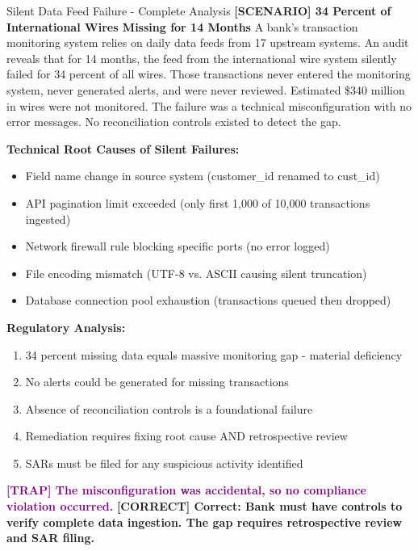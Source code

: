 \documentclass[11pt,a4paper]{beamer}
\newcommand{\trap}[1]{\textcolor{purple}{\textbf{[TRAP] #1}}}
\newcommand{\correct}[1]{\textcolor{green!50!black}{\textbf{[CORRECT] #1}}}
\newcommand{\scenario}[1]{\textcolor{blue!70!black}{\textbf{[SCENARIO] #1}}}
\begin{document}
	\begin{frame}{Silent Data Feed Failure - Complete Analysis}
		\scenario{34 Percent of International Wires Missing for 14 Months}
		A bank's transaction monitoring system relies on daily data feeds from 17 upstream systems. An audit reveals that for 14 months, the feed from the international wire system silently failed for 34 percent of all wires. Those transactions never entered the monitoring system, never generated alerts, and were never reviewed. Estimated \$340 million in wires were not monitored. The failure was a technical misconfiguration with no error messages. No reconciliation controls existed to detect the gap.
		
		\textbf{Technical Root Causes of Silent Failures:}
		\begin{itemize}
			\item Field name change in source system (customer\_id renamed to cust\_id)
			\item API pagination limit exceeded (only first 1,000 of 10,000 transactions ingested)
			\item Network firewall rule blocking specific ports (no error logged)
			\item File encoding mismatch (UTF-8 vs. ASCII causing silent truncation)
			\item Database connection pool exhaustion (transactions queued then dropped)
		\end{itemize}
		
		\textbf{Regulatory Analysis:}
		\begin{enumerate}
			\item 34 percent missing data equals massive monitoring gap - material deficiency
			\item No alerts could be generated for missing transactions
			\item Absence of reconciliation controls is a foundational failure
			\item Remediation requires fixing root cause AND retrospective review
			\item SARs must be filed for any suspicious activity identified
		\end{enumerate}
		
		\trap{The misconfiguration was accidental, so no compliance violation occurred.}
		\correct{Correct: Bank must have controls to verify complete data ingestion. The gap requires retrospective review and SAR filing.}
	\end{frame}
	
\end{document}
